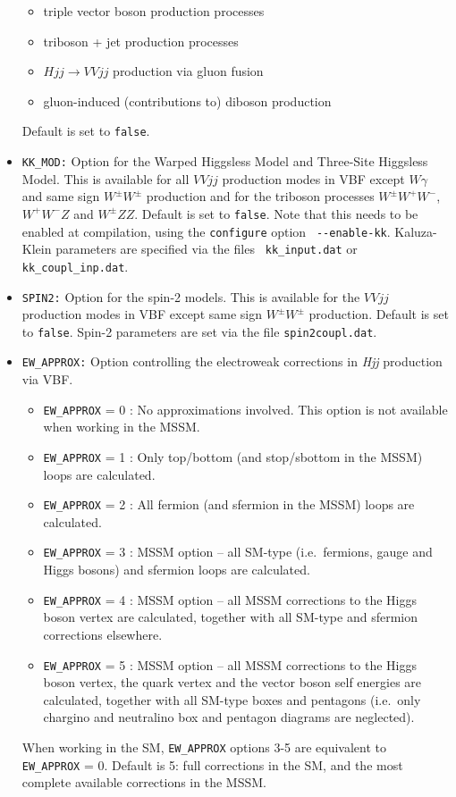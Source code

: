 \documentclass[english,12pt]{article}
\begin{document}
\begin{itemize}
\begin{itemize}
    \item triple vector boson production processes
    \item triboson + jet production processes
    \item $Hjj \rightarrow VV jj$ production via gluon fusion
    \item gluon-induced (contributions to) diboson production
  \end{itemize}
  Default is set to {\tt false}.
\item {\tt KK\_MOD:} Option for the Warped Higgsless Model and Three-Site
Higgsless Model. This is available for all $VVjj$ production modes in VBF except $W\gamma$ and
same sign $W^\pm W^\pm$ production and for the triboson processes $W^\pm W^+W^-$,
$W^+W^-Z$ and $W^\pm ZZ$. Default is set to {\tt false}.  Note that this needs
to be enabled at compilation, using the {\tt configure} option {\tt
-{}-enable-kk}.  Kaluza-Klein parameters are specified via the files {\tt
kk\_input.dat} or {\tt kk\_coupl\_inp.dat}.
\item {\tt SPIN2:} Option for the spin-2 models.  This is available for the
$VVjj$ production modes in VBF except same sign $W^\pm W^\pm$ production.  Default is set
to {\tt false}. 
Spin-2 parameters are set via
the file {\tt spin2coupl.dat}.
\item {\tt EW\_APPROX:} Option controlling the electroweak corrections in
\textit{Hjj} production via VBF.
  \begin{itemize}
   \item {\tt EW\_APPROX} = 0 : No approximations involved.  This option is not
available when working in the MSSM.
   \item {\tt EW\_APPROX} = 1 : Only top/bottom (and stop/sbottom in the MSSM) loops
are calculated. 
   \item {\tt EW\_APPROX} = 2 : All fermion (and sfermion in the MSSM) loops are
calculated.
   \item {\tt EW\_APPROX} = 3 : MSSM option -- all SM-type (i.e.\ fermions,
gauge and Higgs bosons) and sfermion loops are calculated.
   \item {\tt EW\_APPROX} = 4 : MSSM option -- all MSSM corrections to the Higgs boson
vertex are calculated, together with all SM-type and sfermion corrections
elsewhere.
   \item {\tt EW\_APPROX} = 5 : MSSM option -- all MSSM corrections to the Higgs boson
vertex, the quark vertex and the vector boson self energies are calculated,
together with all SM-type boxes and pentagons (i.e.\ only chargino and
neutralino box and pentagon diagrams are neglected).
  \end{itemize}
  When working in the SM, {\tt EW\_APPROX} options 3-5 are equivalent to {\tt
EW\_APPROX} = 0.  Default is 5: full corrections in the SM, and the most
complete available corrections in the MSSM.
\end{itemize}
\end{document}
